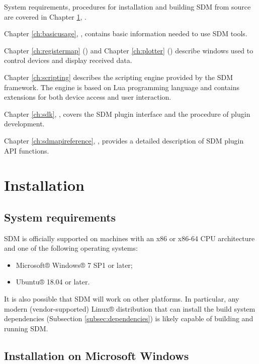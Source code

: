 \documentclass[a4paper,12pt,twoside,extrafontsizes]{memoir}
\begin{document}
System requirements, procedures for installation and building SDM from source are covered in Chapter \ref{ch:installation}, .

Chapter \ref{ch:basicusage}, , contains basic information needed to use SDM tools.

Chapter \ref{ch:registermap} () and Chapter \ref{ch:plotter} () describe  windows used to control devices and display received data.

Chapter \ref{ch:scripting} describes the scripting engine provided by the SDM framework. The engine is based on Lua programming language and contains extensions for both device access and user interaction.

Chapter \ref{ch:sdk}, , covers the SDM plugin interface and the procedure of plugin development.

Chapter \ref{ch:sdmapireference}, , provides a detailed description of SDM plugin API functions.

\chapter{Installation}
\label{ch:installation}

\section{System requirements}

SDM is officially supported on machines with an x86 or x86-64 CPU architecture and one of the following operating systems:

\begin{itemize}
	\item Microsoft® Windows® 7 SP1 or later;
	\item Ubuntu® 18.04 or later.
\end{itemize}

It is also possible that SDM will work on other platforms. In particular, any modern (vendor-supported) Linux® distribution that can install the build system dependencies (Subsection \ref{subsec:dependencies}) is likely capable of building and running SDM.

\section{Installation on Microsoft Windows}
\end{document}
